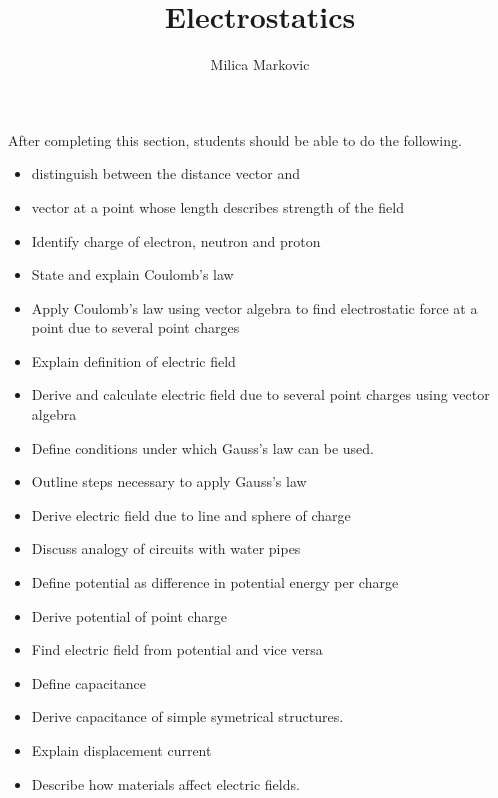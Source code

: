 \documentclass{ximera}
\title{Electrostatics}
\author{Milica Markovic}
\begin{document}
\begin{abstract}
\end{abstract}

\maketitle

\begin{sectionOutcomes}

After completing this section, students should be able to do the following.

\begin{itemize}
\item distinguish between the distance vector and 
\item vector at a point whose length describes strength of the field
\item Identify charge of electron, neutron and proton 
\item State and explain Coulomb’s law
\item Apply Coulomb’s law using vector algebra to find electrostatic force at a point due to several point charges
\item Explain definition of electric field
\item Derive and calculate electric field due to several point charges using vector algebra 
\item Define conditions under which Gauss’s law can be used.
\item Outline steps necessary to apply Gauss’s law
\item Derive electric field due to line and sphere of charge
\item Discuss analogy of circuits with water pipes
\item Define potential as difference in potential energy per charge
\item  Derive potential of point charge
\item Find electric field from potential and vice versa
\item Define capacitance
\item Derive capacitance of simple symetrical structures.
\item Explain displacement current
\item Describe how materials affect electric fields.
\end{itemize}

\end{sectionOutcomes}
\end{document}
